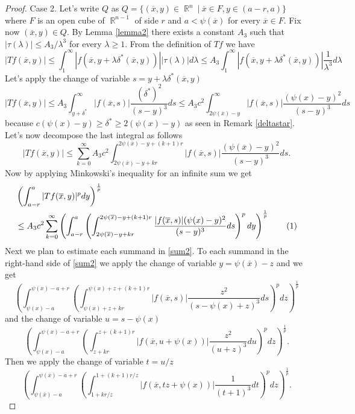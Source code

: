 \documentclass[12pt]{article}
\theoremstyle{definition}
\DeclareMathOperator\rr{\mathbb{R}}
\newcommand\addtag{\refstepcounter{equation}\tag{\theequation}}
\begin{document}
\begin{proof}
Case 2. Let's write $Q$ as $Q=\{ (\overline x,y) \in \rr^n \ | \ \overline x \in F, y \in (a-r,a) \}$ where $F$ is an open cube of $\rr^{n-1}$ of side $r$ and $a<\psi(\overline x)$ for every $\overline x \in F$. Fix now $(\overline x, y) \in Q$. By Lemma \ref{lemma2} there exists a constant $A_3$ such that $|\tau(\lambda)|\le A_3/\lambda^3$  for every $\lambda \ge 1.$ From the definition of $Tf$ we have
\begin{equation} |Tf(\overline x,y)| \le\int_1^\infty |f(\overline x, y+\lambda \delta^*(\overline x,y))||\tau(\lambda)|d\lambda \le A_3 \int_1^\infty |f(\overline x, y+\lambda \delta^*(\overline x,y))|\frac{1}{\lambda^3}d\lambda \label{bullet1}
\end{equation}
Let's apply the change of variable $s=y+\lambda \delta^*(\overline x,y)$
\begin{equation}  |Tf(\overline x,y)|\le A_3\int_{y+\delta^*}^\infty |f(\overline x, s)|\frac{(\delta^*)^2}{(s-y)^3}ds\le A_3 c^2 \int_{2\psi(\overline x)-y}^\infty |f(\overline x, s)|\frac{(\psi(x)-y)^2}{(s-y)^3}ds \label{bullet2}
\end{equation} 
because $c(\psi(x)-y)\ge\delta^*\ge 2(\psi(x)-y)$ as seen in Remark \ref{deltastar}. Let's now decompose the last integral as follows
\[ |Tf(\overline x,y)|\le \sum_{k=0}^\infty A_3c^2\int_{2\psi(\overline x)-y+kr}^{2\psi(\overline x)-y+(k+1)r} |f(\overline x, s)|\frac{(\psi(\overline x)-y)^2}{(s-y)^3}ds.\]
Now by applying Minkowski's inequality for an infinite sum we get
\begin{align*} &\left(\int_{a-r}^{a}|Tf(\overline x,y)|^p dy\right)^{\frac{1}{p}} \\
&\le A_3 c^2\sum_{k=0}^\infty \left( \int_{a-r}^{a}\left ( \int_{2\psi(\overline x)-y+kr}^{2\psi(\overline x)-y+(k+1)r} \frac{|f(\overline x, s)|(\psi(x)-y)^2}{(s-y)^3}ds\right)^pdy \right)^{\frac{1}{p}} \addtag \label{sum2} 
\end{align*}
Next we plan to estimate each summand in \eqref{sum2}. To each summand in the right-hand side of \eqref{sum2} we apply the change of variable $y=\psi(\overline x)-z$ and we get
\[ \left( \int_{\psi(x)-a}^{\psi(x)-a+r}\left (\int_{\psi(x)+z+kr}^{\psi(x)+z+(k+1)r} |f(\overline x, s)|\frac{z^2}{(s-\psi(x)+z)^3}ds\right)^pdz \right)^{\frac{1}{p}}\]
and the change of variable $u=s-\psi(x)$
\[ \left( \int_{\psi(x)-a}^{\psi(x)-a+r}\left (\int_{z+kr}^{z+(k+1)r} |f(\overline x, u+\psi(x))|\frac{z^2}{(u+z)^3}du\right)^pdz \right)^{\frac{1}{p}}.\]
Then we apply the change of variable $t=u/z$
\[ \left( \int_{\psi(\overline x) - a}^{\psi(\overline x) -a+r}\left (\int_{1+kr/z}^{1+(k+1)r/z} |f(\overline x, tz+\psi(x))|\frac{1}{(t+1)^3}dt\right)^pdz \right)^{\frac{1}{p}}.\]

\end{proof}
\end{document}
